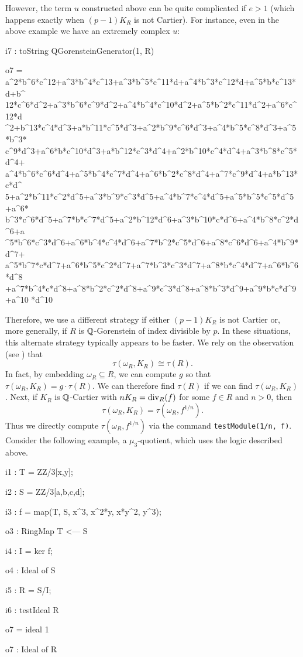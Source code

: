 \documentclass{amsart}
\begin{document}
However, the term $u$ constructed above can be quite complicated if $e > 1$ (which happens exactly when $(p -1)K_R$ is not Cartier).  For instance, even in the above example we have an extremely complex $u$:

\medskip
{\small{}
\begin{MyVerbatim}
i7 : toString QGorensteinGenerator(1, R)

o7 = a^2*b^6*c^12+a^3*b^4*c^13+a^3*b^5*c^11*d+a^4*b^3*c^12*d+a^5*b*c^13*d+b^
     12*c^6*d^2+a^3*b^6*c^9*d^2+a^4*b^4*c^10*d^2+a^5*b^2*c^11*d^2+a^6*c^12*d
     ^2+b^13*c^4*d^3+a*b^11*c^5*d^3+a^2*b^9*c^6*d^3+a^4*b^5*c^8*d^3+a^5*b^3*
     c^9*d^3+a^6*b*c^10*d^3+a*b^12*c^3*d^4+a^2*b^10*c^4*d^4+a^3*b^8*c^5*d^4+
     a^4*b^6*c^6*d^4+a^5*b^4*c^7*d^4+a^6*b^2*c^8*d^4+a^7*c^9*d^4+a*b^13*c*d^
     5+a^2*b^11*c^2*d^5+a^3*b^9*c^3*d^5+a^4*b^7*c^4*d^5+a^5*b^5*c^5*d^5+a^6*
     b^3*c^6*d^5+a^7*b*c^7*d^5+a^2*b^12*d^6+a^3*b^10*c*d^6+a^4*b^8*c^2*d^6+a
     ^5*b^6*c^3*d^6+a^6*b^4*c^4*d^6+a^7*b^2*c^5*d^6+a^8*c^6*d^6+a^4*b^9*d^7+
     a^5*b^7*c*d^7+a^6*b^5*c^2*d^7+a^7*b^3*c^3*d^7+a^8*b*c^4*d^7+a^6*b^6*d^8
     +a^7*b^4*c*d^8+a^8*b^2*c^2*d^8+a^9*c^3*d^8+a^8*b^3*d^9+a^9*b*c*d^9+a^10
     *d^10
\end{MyVerbatim}
}\medskip

Therefore, we use a different strategy if either $(p-1)K_R$ is not Cartier or, more generally, if $R$ is $\mathbb{Q}$-Gorenstein of index divisible by $p$.
In these situations, this alternate strategy typically appears to be faster.  We rely on the observation (see \cite{BlickleSchwedeTuckerTestAlterations}) that
\[
\tau(\omega_R, K_R) \cong \tau(R).
\]
In fact, by embedding $\omega_R \subseteq R$, we can compute $g$ so that $\tau(\omega_R, K_R) = g\cdot \tau(R)$.  We can therefore find $\tau(R)$ if we can find $\tau(\omega_R, K_R)$.
Next, if $K_R$ is $\mathbb{Q}$-Cartier with $nK_R = \operatorname{{div}}_R(f)$ for some $f \in R$ and $n > 0$, then
\[
\tau(\omega_R, K_R) =\tau(\omega_R, f^{1/n}).
\]
Thus we directly compute $\tau(\omega_R, f^{1/n})$ via the command \texttt{testModule(1/n, f)}.  Consider the following example, a $\mu_3$-quotient, which uses the logic described above.

\medskip
{\small
{}
\begin{MyVerbatim}
i1 : T = ZZ/3[x,y];

i2 : S = ZZ/3[a,b,c,d];

i3 : f = map(T, S, {x^3, x^2*y, x*y^2, y^3});

o3 : RingMap T <--- S

i4 : I = ker f;

o4 : Ideal of S

i5 : R = S/I;

i6 : testIdeal R

o7 = ideal 1

o7 : Ideal of R
\end{MyVerbatim}
}\medskip
\end{document}
